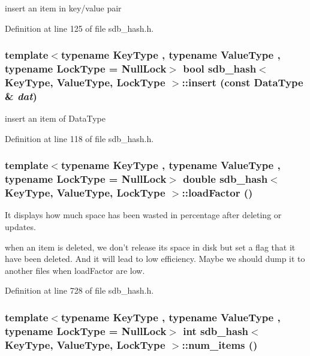 insert an item in key/value pair 

Definition at line 125 of file sdb\_\-hash.h.\hypertarget{classsdb__hash_17c82560d424f1d3519e0b4788fd8ef2}{
\subsubsection[{insert}]{\setlength{\rightskip}{0pt plus 5cm}template$<$typename KeyType , typename ValueType , typename LockType  = NullLock$>$ bool {\bf sdb\_\-hash}$<$ KeyType, ValueType, LockType $>$::insert (const DataType \& {\em dat})}}
\label{classsdb__hash_17c82560d424f1d3519e0b4788fd8ef2}


insert an item of DataType 

Definition at line 118 of file sdb\_\-hash.h.\hypertarget{classsdb__hash_23fdd1400cd2c1e7f922b16a8a372924}{
\subsubsection[{loadFactor}]{\setlength{\rightskip}{0pt plus 5cm}template$<$typename KeyType , typename ValueType , typename LockType  = NullLock$>$ double {\bf sdb\_\-hash}$<$ KeyType, ValueType, LockType $>$::loadFactor ()}}
\label{classsdb__hash_23fdd1400cd2c1e7f922b16a8a372924}


It displays how much space has been wasted in percentage after deleting or updates. 

when an item is deleted, we don't release its space in disk but set a flag that it have been deleted. And it will lead to low efficiency. Maybe we should dump it to another files when loadFactor are low. 

Definition at line 728 of file sdb\_\-hash.h.\hypertarget{classsdb__hash_0abd12e832bafd55d622f67497df47f9}{
\subsubsection[{num\_\-items}]{\setlength{\rightskip}{0pt plus 5cm}template$<$typename KeyType , typename ValueType , typename LockType  = NullLock$>$ int {\bf sdb\_\-hash}$<$ KeyType, ValueType, LockType $>$::num\_\-items ()}}
\label{classsdb__hash_0abd12e832bafd55d622f67497df47f9}


